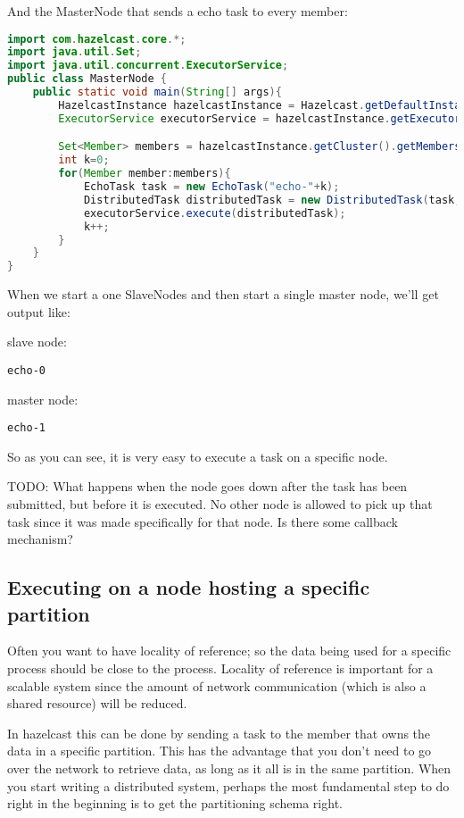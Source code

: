 And the MasterNode that sends a echo task to every member:
\begin{lstlisting}[language=java]
import com.hazelcast.core.*;
import java.util.Set;
import java.util.concurrent.ExecutorService;
public class MasterNode {
    public static void main(String[] args){
        HazelcastInstance hazelcastInstance = Hazelcast.getDefaultInstance();
        ExecutorService executorService = hazelcastInstance.getExecutorService();

        Set<Member> members = hazelcastInstance.getCluster().getMembers();
        int k=0;
        for(Member member:members){
            EchoTask task = new EchoTask("echo-"+k);
            DistributedTask distributedTask = new DistributedTask(task, member);
            executorService.execute(distributedTask);
            k++;
        }
    }
}
\end{lstlisting}

When we start a one SlaveNodes and then start a single master node, we'll get output like:

slave node:
\begin{verbatim}
echo-0
\end{verbatim}

master node:
\begin{verbatim}
echo-1
\end{verbatim}

So as you can see, it is very easy to execute a task on a specific node.

TODO: What happens when the node goes down after the task has been submitted, but before it is executed. No other node is allowed to pick up that task since it was made specifically for that node. Is there some callback mechanism?

\subsection{Executing on a node hosting a specific partition}
Often you want to have locality of reference; so the data being used for a specific process should be close to the process. Locality of reference is important for a scalable system since the amount of network communication (which is also a shared resource) will be reduced.

In hazelcast this can be done by sending a task to the member that owns the data in a specific partition. This has the advantage that you don't need to go over the network to retrieve data, as long as it all is in the same partition. When you start writing a distributed system, perhaps the most fundamental step to do right in the beginning is to get the partitioning schema right.

